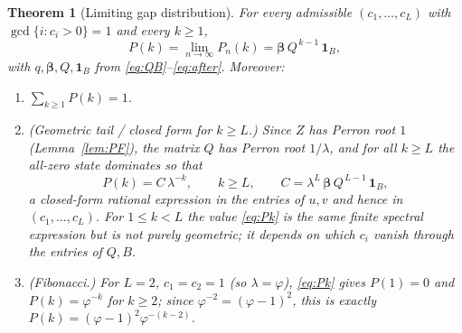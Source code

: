 \documentclass[12pt]{article}
\newtheorem{theorem}{Theorem}
\theoremstyle{definition}
\begin{document}
\begin{theorem}[Limiting gap distribution]\label{thm:gap}
For every admissible $(c_1,\dots,c_L)$ with $\gcd\{i:c_i>0\}=1$ and every
$k\ge1$,
\begin{equation}\label{eq:Pk}
P(k)=\lim_{n\to\infty}P_n(k)
=\boldsymbol\beta\,Q^{\,k-1}\,\mathbf 1_B ,
\end{equation}
with $q,\boldsymbol\beta,Q,\mathbf 1_B$ from \eqref{eq:QB}--\eqref{eq:after}.
Moreover:
\begin{enumerate}
\item[(i)] $\sum_{k\ge1}P(k)=1$.
\item[(ii)] (Geometric tail / closed form for $k\ge L$.) Since $Z$ has Perron
root $1$ (Lemma~\ref{lem:PF}), the matrix $Q$ has Perron root $1/\lambda$, and
for all $k\ge L$ the all-zero state dominates so that
\begin{equation}\label{eq:tail}
P(k)=C\,\lambda^{-k},\qquad k\ge L,\qquad
C=\lambda^{L}\,\boldsymbol\beta\,Q^{\,L-1}\,\mathbf 1_B ,
\end{equation}
a closed-form rational expression in the entries of $u,v$ and hence in
$(c_1,\dots,c_L)$. For $1\le k<L$ the value \eqref{eq:Pk} is the same finite
spectral expression but is \emph{not} purely geometric; it depends on which
$c_i$ vanish through the entries of $Q,B$.
\item[(iii)] (Fibonacci.) For $L=2$, $c_1=c_2=1$ (so $\lambda=\varphi$),
\eqref{eq:Pk} gives $P(1)=0$ and $P(k)=\varphi^{-k}$ for $k\ge2$; since
$\varphi^{-2}=(\varphi-1)^2$, this is exactly $P(k)=(\varphi-1)^2\varphi^{-(k-2)}$.
\end{enumerate}
\end{theorem}
\end{document}
